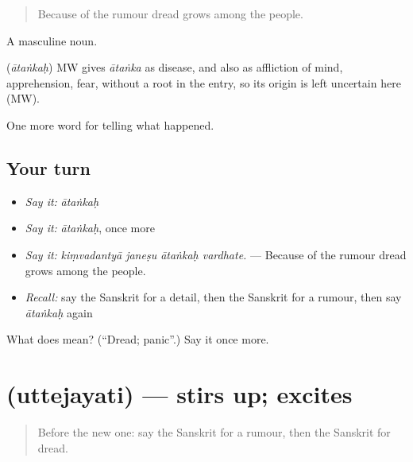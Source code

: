 \begin{quote}
Because of the rumour dread grows among the people.
\end{quote}

A masculine noun.

\begin{cousinweb}
\textbf{} (\emph{ātaṅkaḥ}) MW gives \emph{ātaṅka} as disease, and also as affliction of mind, apprehension, fear, without a root in the entry, so its origin is left uncertain here (MW).
\end{cousinweb}

\begin{grammarlens}[title={What you've built}]
One more word for telling what happened.
\end{grammarlens}

\subsection*{Your turn}
\begin{itemize}
\raggedright
  \item \emph{Say it:} \emph{ātaṅkaḥ}
  \item \emph{Say it:} \emph{ātaṅkaḥ}, once more
  \item \emph{Say it:} \emph{kiṃvadantyā janeṣu ātaṅkaḥ vardhate.} — Because of the rumour dread grows among the people.
  \item \emph{Recall:} say the Sanskrit for a detail, then the Sanskrit for a rumour, then say \emph{ātaṅkaḥ} again
\end{itemize}

\begin{tcolorbox}[breakable,colback=teal!4,colframe=teal!35!black,title={Before you move on}]
What does  mean? (\textquotedblleft{}Dread; panic\textquotedblright{}.) Say it once more.
\end{tcolorbox}
\section[\texorpdfstring{\sk{उत्तेजयति} (uttejayati)}{उत्तेजयति (uttejayati)}]{ (uttejayati) — stirs up; excites}

\label{lesson:SA-C311-uttejayati}



\begin{quote}
Before the new one: say the Sanskrit for a rumour, then the Sanskrit for dread.
\end{quote}

